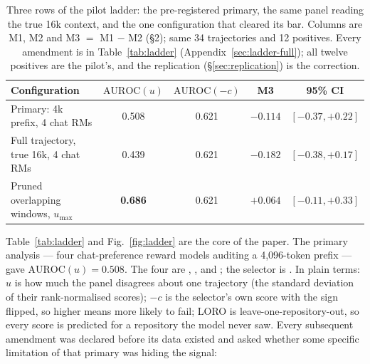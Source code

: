 \documentclass[11pt]{article}
\begin{document}
\begin{table}[t]\centering\footnotesize
\begin{tabular}{lcccc}\toprule
Configuration & $\mathrm{AUROC}(u)$ & $\mathrm{AUROC}(-c)$ & M3 & 95\% CI \\\midrule
Primary: 4k prefix, 4 chat RMs & 0.508 & 0.621 & $-0.114$ & $[-0.37, +0.22]$ \\
Full trajectory, true 16k, 4 chat RMs & 0.439 & 0.621 & $-0.182$ & $[-0.38, +0.17]$ \\
\midrule
Pruned overlapping windows, $u_{\max}$ & \textbf{0.686} & 0.621 & $+0.064$ & $[-0.11, +0.33]$ \\\bottomrule
\end{tabular}
\caption{Three rows of the pilot ladder: the pre-registered primary, the same panel reading the true 16k context, and the one configuration that cleared its bar. Columns are M1, M2 and M3 $=$ M1 $-$ M2 (\S2); same 34 trajectories and 12 positives. Every amendment is in Table~\ref{tab:ladder} (Appendix~\ref{sec:ladder-full}); all twelve positives are the pilot's, and the replication (\S\ref{sec:replication}) is the correction.}\label{tab:ladder-short}\end{table}

Table~\ref{tab:ladder} and Fig.~\ref{fig:ladder} are the core of the paper. The primary analysis --- four chat-preference reward models auditing a 4{,}096-token prefix --- gave $\mathrm{AUROC}(u)=0.508$. The four are , ,  and ; the selector is . In plain terms: $u$ is how much the panel disagrees about one trajectory (the standard deviation of their rank-normalised scores); $-c$ is the selector's own score with the sign flipped, so higher means more likely to fail; LORO is leave-one-repository-out, so every score is predicted for a repository the model never saw. Every subsequent amendment was declared before its data existed and asked whether some specific limitation of that primary was hiding the signal:
\end{document}
